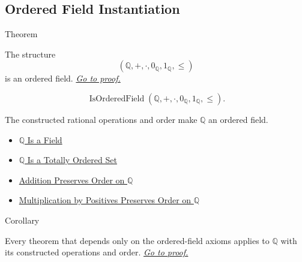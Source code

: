 \subsection*{Ordered Field Instantiation}

\begin{theorembox}{Theorem}
\begin{theorem}
\label{thm:q-is-an-ordered-field}
The structure
\[
(\mathbb{Q},+,\cdot,0_{\mathbb{Q}},1_{\mathbb{Q}},\le)
\]
is an ordered field.
\hyperref[prf:q-is-an-ordered-field]{\textit{Go to proof.}}
\end{theorem}
\end{theorembox}

\begin{remark*}
\[
\operatorname{IsOrderedField}(\mathbb{Q},+,\cdot,0_{\mathbb{Q}},1_{\mathbb{Q}},\le).
\]
\end{remark*}

\begin{remark*}[Interpretation]
The constructed rational operations and order make $\mathbb{Q}$ an ordered field.
\end{remark*}

\begin{dependencies}
\begin{itemize}
  \item \hyperref[thm:q-is-a-field]{$\mathbb{Q}$ Is
 a Field}
  \item \hyperref[thm:q-totally-ordered-set]{$\mathbb{Q}$ Is a Totally Ordered Set}
  \item \hyperref[thm:addition-preserves-order-on-q]{Addition Preserves Order on $\mathbb{Q}$}
  \item \hyperref[thm:positive-multiplication-preserves-order-on-q]{Multiplication by Positives Preserves Order on $\mathbb{Q}$}
\end{itemize}
\end{dependencies}

\begin{corollarybox}{Corollary}
\begin{corollary}
\label{cor:ordered-field-laws-on-q}
Every theorem that depends only on the ordered-field axioms applies to
$\mathbb{Q}$ with its constructed operations and order.
\hyperref[prf:ordered-field-laws-on-q]{\textit{Go to proof.}}
\end{corollary}
\end{corollarybox}

